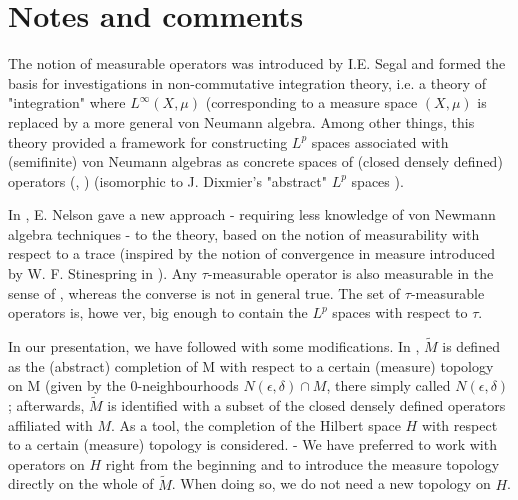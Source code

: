 \section{Notes and comments}
The notion of measurable operators was introduced by I.E. Segal \cite{15} and formed the basis for investigations in non-commutative integration theory, i.e. a theory of "integration" where $L^\infty(X,\mu)$ (corresponding to a measure space $(X,\mu)$ is replaced by a more general von Neumann algebra. Among other things, this theory provided a framework for constructing $L^p$ spaces associated with (semifinite) von Neumann algebras as concrete spaces of (closed densely defined) operators (\cite{12}, \cite{21}) (isomorphic to J. Dixmier's "abstract" $L^p$ spaces \cite{3}).\par
In \cite{13}, E. Nelson gave a new approach - requiring less knowledge of von Newmann algebra techniques - to the theory, based on the notion of measurability with respect to a trace (inspired by the notion of convergence in measure introduced by W. F. Stinespring in \cite{16}). Any $\tau$-measurable operator is also measurable in the sense of \cite[Definition 2.1]{15}, whereas the converse is not in general true. The set of $\tau$-measurable operators is, howe ver, big enough to contain the $L^p$ spaces with respect to $\tau$.\par
In our presentation, we have followed \cite{13} with some modifications. In \cite{13}, $\widetilde{M}$ is defined as the (abstract) completion of M with respect to a certain (measure) topology on M (given by the $0$-neighbourhoods $N(\epsilon,\delta)\cap M$, there simply called $N(\epsilon,\delta)$; afterwards, $\widetilde{M}$ is identified with a subset of the closed densely defined operators affiliated with $M$. As a tool, the completion of the Hilbert space $H$ with respect to a certain (measure) topology is considered. - We have preferred to work with operators on $H$ right from the beginning and to introduce the measure topology directly on the whole of $\widetilde{M}$. When doing so, we do not need a new topology on $H$.
% 